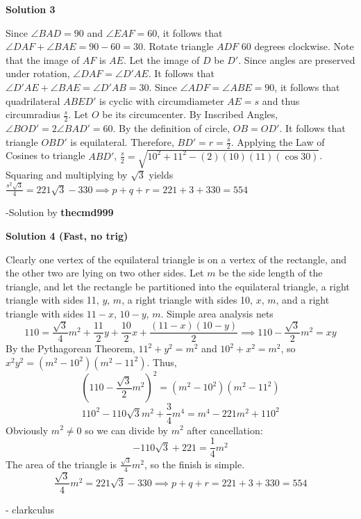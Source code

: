 \begin{enumerate}
\textbf{Solution 3}

Since $\angle{BAD}=90$ and $\angle{EAF}=60$, it follows that $\angle{DAF}+\angle{BAE}=90-60=30$. Rotate triangle $ADF$ $60$ degrees clockwise. Note that the image of $AF$ is $AE$. Let the image of $D$ be $D'$. Since angles are preserved under rotation, $\angle{DAF}=\angle{D'AE}$. It follows that $\angle{D'AE}+\angle{BAE}=\angle{D'AB}=30$. Since $\angle{ADF}=\angle{ABE}=90$, it follows that quadrilateral $ABED'$ is cyclic with circumdiameter $AE=s$ and thus circumradius $\frac{s}{2}$. Let $O$ be its circumcenter. By Inscribed Angles, $\angle{BOD'}=2\angle{BAD'}=60$. By the definition of circle, $OB=OD'$. It follows that triangle $OBD'$ is equilateral. Therefore, $BD'=r=\frac{s}{2}$. Applying the Law of Cosines to triangle $ABD'$, $\frac{s}{2}=\sqrt{10^2+11^2-(2)(10)(11)(\cos{30})}$. Squaring and multiplying by $\sqrt{3}$ yields $\frac{s^2\sqrt{3}}{4}=221\sqrt{3}-330\implies{p+q+r=221+3+330=\boxed{554}}$

 -Solution by \textbf{thecmd999}

 



\textbf{Solution 4 (Fast, no trig)}

Clearly one vertex of the equilateral triangle is on a vertex of the rectangle, and the other two are lying on two other sides. Let $m$ be the side length of the triangle, and let the rectangle be partitioned into the equilateral triangle, a right triangle with sides 11, $y$, $m$, a right triangle with sides 10, $x$, $m$, and a right triangle with sides $11-x$, $10-y$, $m$. Simple area analysis nets 
 \[110=\frac{\sqrt{3}}{4}m^2+\frac{11}{2}y+\frac{10}{2}x+\frac{(11-x)(10-y)}{2}\implies 110-\frac{\sqrt{3}}{2}m^2=xy\]By the Pythagorean Theorem, $11^2+y^2=m^2$ and $10^2+x^2=m^2$, so $x^2y^2=(m^2-10^2)(m^2-11^2)$. Thus,
 \[(110-\frac{\sqrt{3}}{2}m^2)^2=(m^2-10^2)(m^2-11^2)\]
 \[110^2-110\sqrt{3}m^2+\frac34m^4=m^4-221m^2+110^2\]Obviously $m^2\neq0$ so we can divide by $m^2$ after cancellation:
 \[-110\sqrt{3}+221=\frac14m^2\]The area of the triangle is $\frac{\sqrt{3}}{4}m^2$, so the finish is simple.
 \[\frac{\sqrt{3}}{4}m^2=221\sqrt{3}-330\implies p+q+r=221+3+330=\boxed{554}\]

 - clarkculus

 


\end{enumerate}